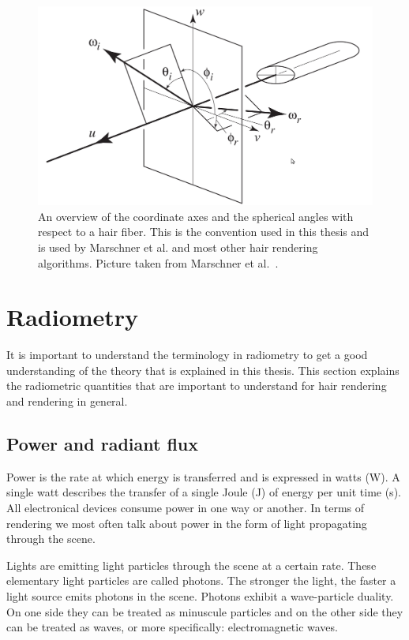 \documentclass[11pt,a4paper]{report}
\begin{document}
\begin{center}
\begin{figure}

\includegraphics[scale=.4]{images/axes.jpeg}

\caption{An overview of the coordinate axes and the spherical angles with respect to a hair fiber. This is the convention used in this thesis and is used by Marschner et al. and most other hair rendering algorithms. Picture taken from Marschner et al.~\cite{marschner}.}
\label{axis_overview}

\end{figure}
\end{center}

\section{Radiometry}
It is important to understand the terminology in radiometry to get a good understanding of the theory that is explained in this thesis. This section explains the radiometric quantities that are important to understand for hair rendering and rendering in general.

\subsection{Power and radiant flux}

Power is the rate at which energy is transferred and is expressed in watts (W). A single watt describes the transfer of a single Joule (J) of energy per unit time (s). All electronical devices consume power in one way or another. In terms of rendering we most often talk about power in the form of light propagating through the scene. 

Lights are emitting light particles through the scene at a certain rate. These elementary light particles are called photons. The stronger the light, the faster a light source emits photons in the scene. Photons exhibit a wave-particle duality. On one side they can be treated as minuscule particles and on the other side they can be treated as waves, or more specifically: electromagnetic waves.
\end{document}
